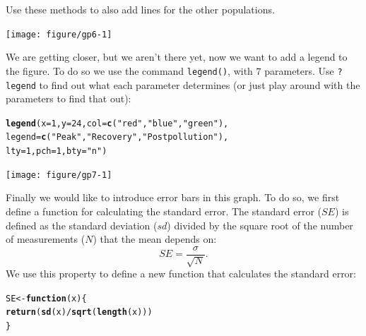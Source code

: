 \documentclass[12pt,a4paper]{article}\usepackage[]{graphicx}\usepackage[]{color}
\makeatletter
\newcommand{\hlnum}[1]{\textcolor[rgb]{0.686,0.059,0.569}{#1}}%
\newcommand{\hlstr}[1]{\textcolor[rgb]{0.192,0.494,0.8}{#1}}%
\newcommand{\hlopt}[1]{\textcolor[rgb]{0,0,0}{#1}}%
\newcommand{\hlstd}[1]{\textcolor[rgb]{0.345,0.345,0.345}{#1}}%
\newcommand{\hlkwa}[1]{\textcolor[rgb]{0.161,0.373,0.58}{\textbf{#1}}}%
\newcommand{\hlkwb}[1]{\textcolor[rgb]{0.69,0.353,0.396}{#1}}%
\newcommand{\hlkwc}[1]{\textcolor[rgb]{0.333,0.667,0.333}{#1}}%
\newcommand{\hlkwd}[1]{\textcolor[rgb]{0.737,0.353,0.396}{\textbf{#1}}}%
\newenvironment{kframe}{%
 \def\at@end@of@kframe{}%
 \ifinner\ifhmode%
  \def\at@end@of@kframe{\end{minipage}}%
  \begin{minipage}{\columnwidth}%
 \fi\fi%
 \def\FrameCommand##1{\hskip\@totalleftmargin \hskip-\fboxsep
 \colorbox{shadecolor}{##1}\hskip-\fboxsep
     \hskip-\linewidth \hskip-\@totalleftmargin \hskip\columnwidth}%
 \MakeFramed {\advance\hsize-\width
   \@totalleftmargin\z@ \linewidth\hsize
   \@setminipage}}%
 {\par\unskip\endMakeFramed%
 \at@end@of@kframe}
\newenvironment{knitrout}{}{} %
\makeatother
\begin{document}
Use these methods to also add lines for the other populations.\\
\begin{knitrout}
\color{fgcolor}

{\centering \texttt{[image: figure/gp6-1]} 

}



\end{knitrout}
We are getting closer, but we aren't there yet, now we want to add a legend to the figure. To do so we use the command \texttt{legend()}, with $7$ parameters. Use \texttt{?legend} to find out what each parameter determines (or just play around with the parameters to find that out):
\begin{knitrout}
\color{fgcolor}\begin{kframe}
\begin{alltt}
\hlkwd{legend}\hlstd{(}\hlkwc{x}\hlstd{=}\hlnum{1}\hlstd{,} \hlkwc{y}\hlstd{=}\hlnum{24}\hlstd{,} \hlkwc{col}\hlstd{=}\hlkwd{c}\hlstd{(}\hlstr{"red"}\hlstd{,}\hlstr{"blue"}\hlstd{,}\hlstr{"green"}\hlstd{),}
\hlkwc{legend}\hlstd{=}\hlkwd{c}\hlstd{(}\hlstr{"Peak"}\hlstd{,} \hlstr{"Recovery"}\hlstd{,} \hlstr{"Postpollution"}\hlstd{),}
\hlkwc{lty}\hlstd{=}\hlnum{1}\hlstd{,} \hlkwc{pch}\hlstd{=}\hlnum{1}\hlstd{,} \hlkwc{bty}\hlstd{=}\hlstr{"n"}\hlstd{)}
\end{alltt}
\end{kframe}

{\centering \texttt{[image: figure/gp7-1]} 

}



\end{knitrout}
Finally we would like to introduce error bars in this graph. To do so, we first define a function for calculating the standard error. The standard error ($SE$) is defined as the standard deviation ($sd$) divided by the square root of the number of measurements ($N$) that the mean depends on:
\begin{equation*}
SE = \frac{\sigma}{\sqrt{N}}.
\end{equation*}
We use this property to define a new function that calculates the standard error:
\begin{knitrout}
\color{fgcolor}\begin{kframe}
\begin{alltt}
\hlstd{SE} \hlkwb{<-} \hlkwa{function}\hlstd{(}\hlkwc{x}\hlstd{)\{}
  \hlkwd{return}\hlstd{(}\hlkwd{sd}\hlstd{(x)} \hlopt{/} \hlkwd{sqrt}\hlstd{(}\hlkwd{length}\hlstd{(x)))}
\hlstd{\}}
\end{alltt}
\end{kframe}
\end{knitrout}
\end{document}
